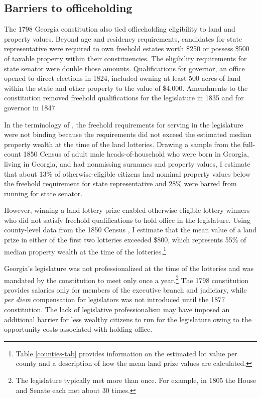 \subsection{Barriers to officeholding} \label{barriers}

The 1798 Georgia constitution also tied officeholding eligibility to land and property values. Beyond age and residency requirements, candidates for state representative were required to own freehold estates worth \$250 or possess \$500 of taxable property within their constituencies. The eligibility requirements for state senator were double those amounts. Qualifications for governor, an office opened to direct elections in 1824, included owning at least 500 acres of land within the state and other property to the value of \$4,000. Amendments to the constitution removed freehold qualifications for the legislature in 1835 and for governor in 1847. 

In the terminology of \citet{corvalan2018political}, the freehold requirements for serving in the legislature were not binding because the requirements did not exceed the estimated median property wealth at the time of the land lotteries. Drawing a sample from the full-count 1850 Census \citep{ruggles2015} of adult male heads-of-household who were born in Georgia, living in Georgia, and had nonmissing surnames and property values, I estimate that about 13\% of otherwise-eligible citizens had nominal property values below the freehold requirement for state representative and 28\% were barred from running for state senator.

However, winning a land lottery prize enabled otherwise eligible lottery winners who did not satisfy freehold qualifications to hold office in the legislature. Using county-level data from the 1850 Census \citep{haines2004}, I estimate that the mean value of a land prize in either of the first two lotteries exceeded \$800, which represents 55\% of median property wealth at the time of the lotteries.\footnote{Table \ref{counties-tab} provides information on the estimated lot value per county and a description of how the mean land prize values are calculated.}

Georgia's legislature was not professionalized at the time of the lotteries and was mandated by the constitution to meet only once a year.\footnote{The legislature typically met more than once. For example, in 1805 the House and Senate each met about 30 times.} The 1798 constitution provides salaries only for members of the executive branch and judiciary, while \textit{per diem} compensation for legislators was not introduced until the 1877 constitution. The lack of legislative professionalism may have imposed an additional barrier for less wealthy citizens to run for the legislature owing to the opportunity costs associated with holding office.

